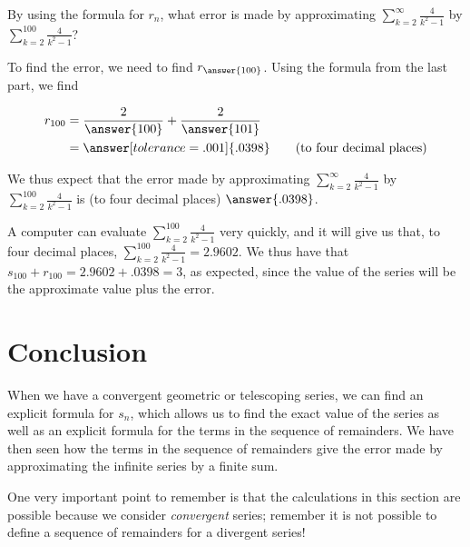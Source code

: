 \documentclass{ximera}
\begin{document}
\begin{example}
\begin{explanation}
\end{explanation}

By using the formula for $r_n$, what error is made by approximating $\sum_{k=2}^{\infty} \frac{4}{k^2-1}$ by $\sum_{k=2}^{100} \frac{4}{k^2-1}$?

\begin{explanation}
To find the error, we need to find $r_{\answer{100}}$.  Using the formula from the last part, we find

\begin{align*}
r_{100} &= \frac{2}{\answer{100}} + \frac{2}{\answer{101}} \\
&= \answer[tolerance=.001]{.0398} \qquad \textrm{(to four decimal places)}
\end{align*}

We thus expect that the error made by approximating $\sum_{k=2}^{\infty} \frac{4}{k^2-1}$ by $\sum_{k=2}^{100} \frac{4}{k^2-1}$ is (to four decimal places) $\answer{.0398}$.

\end{explanation}
\end{example}

\begin{remark}
A computer can evaluate $\sum_{k=2}^{100} \frac{4}{k^2-1}$ very quickly, and it will give us that, to four decimal places, $\sum_{k=2}^{100} \frac{4}{k^2-1} = 2.9602$.  We thus have that $s_{100}+r_{100} = 2.9602+.0398 =3$, as expected, since the value of the series will be the approximate value plus the error.
\end{remark}

\section{Conclusion}
When we have a convergent geometric or telescoping series, we can find an explicit formula for $s_n$, which allows us to find the exact value of the series as well as an explicit formula for the terms in the sequence of remainders.  We have then seen how the terms in the sequence of remainders give the error made by approximating the infinite series by a finite sum.

One very important point to remember is that the calculations in this section are possible because we consider \emph{convergent} series; remember it is not possible to define a sequence of remainders for a divergent series!
\end{document}
